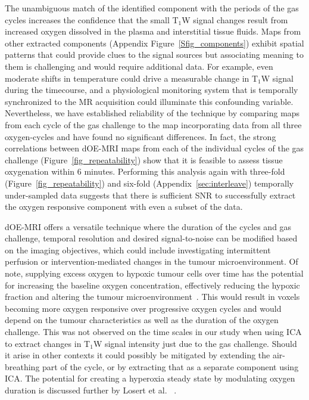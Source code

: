 The unambiguous match of the identified component with the periods of the gas cycles increases the confidence that the small T$_1$W signal changes result from increased oxygen dissolved in the plasma and interstitial tissue fluids.
Maps from other extracted components (Appendix Figure~\ref{Sfig_components}) exhibit spatial patterns that could provide clues to the signal sources but associating meaning to them is challenging and would require additional data.
For example, even moderate shifts in temperature could drive a measurable change in T$_1$W signal during the timecourse, and a physiological monitoring system that is temporally synchronized to the MR acquisition could illuminate this confounding variable. 
Nevertheless, we have established reliability of the technique by comparing maps from each cycle of the gas challenge to the map incorporating data from all three oxygen-cycles and have found no significant differences.
In fact, the strong correlations between \acs{dOE-MRI} maps from each of the individual cycles of the gas challenge (Figure~\ref{fig_repeatability}) show that it is feasible to assess tissue oxygenation within 6 minutes.
Performing this analysis again with three-fold (Figure~\ref{fig_repeatability}) and six-fold (Appendix~\ref{sec:interleave}) temporally under-sampled data suggests that there is sufficient \acs{SNR} to successfully extract the oxygen responsive component  with even a subset of the data.

dOE-MRI offers a versatile technique where the duration of the cycles and gas challenge, temporal resolution and desired signal-to-noise can be modified based on the imaging objectives, which could include investigating intermittent perfusion or intervention-mediated changes in the tumour microenvironment. 
Of note, supplying excess oxygen to hypoxic tumour cells over time has the potential for increasing the baseline oxygen concentration, effectively reducing the hypoxic fraction and altering the tumour microenvironment~\cite{Linnik:2013hf}.
This would result in voxels becoming more oxygen responsive over progressive oxygen cycles and would depend on the tumour characteristics as well as the duration of the oxygen challenge.
This was not observed on the time scales in our study when using \acs{ICA} to extract changes in T$_1$W signal intensity just due to the gas challenge. 
Should it arise in other contexts it could possibly be mitigated by extending the air-breathing part of the cycle, or by extracting that as a separate component using \acs{ICA}.
The potential for creating a hyperoxia steady state by modulating oxygen duration is discussed further by Losert et al. ~\cite{Losert:2002gt}.

